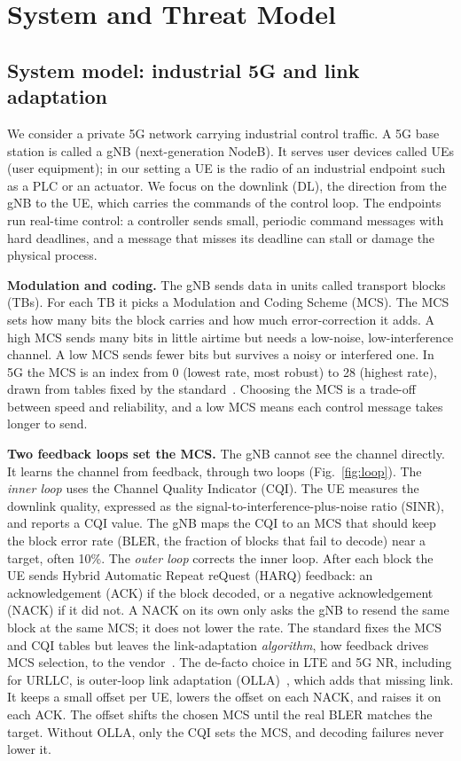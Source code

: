 \documentclass[conference]{IEEEtran}
\begin{document}
\section{System and Threat Model}
\label{sec:system}

\subsection{System model: industrial 5G and link adaptation}
We consider a private 5G network carrying industrial control traffic. A 5G base station
is called a gNB (next-generation NodeB). It serves user devices called UEs (user
equipment); in our setting a UE is the radio of an industrial endpoint such as a PLC or
an actuator. We focus on the downlink (DL), the direction from the gNB to the UE, which
carries the commands of the control loop. The endpoints run real-time control: a
controller sends small, periodic command messages with hard deadlines, and a message
that misses its deadline can stall or damage the physical process.

\textbf{Modulation and coding.} The gNB sends data in units called transport blocks
(TBs). For each TB it picks a Modulation and Coding Scheme (MCS). The MCS sets how many
bits the block carries and how much error-correction it adds. A high MCS sends many bits
in little airtime but needs a low-noise, low-interference channel. A low MCS sends fewer
bits but survives a noisy or interfered one. In 5G the MCS is an index from 0 (lowest rate, most robust) to 28
(highest rate), drawn from tables fixed by the standard~\cite{3gpp38214}. Choosing the
MCS is a trade-off between speed and reliability, and a low MCS means each control message
takes longer to send.

\textbf{Two feedback loops set the MCS.} The gNB cannot see the channel directly. It
learns the channel from feedback, through two loops (Fig.~\ref{fig:loop}). The
\emph{inner loop} uses the Channel Quality Indicator (CQI). The UE measures the downlink
quality, expressed as the signal-to-interference-plus-noise ratio (SINR), and reports a
CQI value. The gNB maps the CQI to an MCS that should keep the block error rate (BLER,
the fraction of blocks that fail to decode) near a target, often 10\%. The \emph{outer
loop} corrects the inner loop. After each block the UE sends Hybrid Automatic Repeat
reQuest (HARQ) feedback: an acknowledgement (ACK) if the block decoded, or a negative
acknowledgement (NACK) if it did not. A NACK on its own only asks the gNB to resend the
same block at the same MCS; it does not lower the rate. The standard fixes the MCS and CQI
tables but leaves the link-adaptation \emph{algorithm}, how feedback drives MCS selection,
to the vendor~\cite{3gpp38214}. The de-facto choice in LTE and 5G NR,
including for URLLC, is outer-loop link adaptation
(OLLA)~\cite{sampath1997olla,blanquez2016eolla,peralta2022olla}, which adds that missing
link. It keeps a small offset per UE,
lowers the offset on each NACK, and raises it on each ACK. The offset shifts the chosen
MCS until the real BLER matches the target. Without OLLA, only the CQI sets the MCS, and
decoding failures never lower it.
\end{document}
